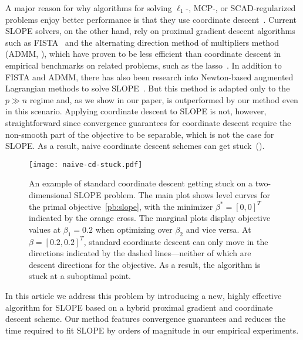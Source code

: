 A major reason for why algorithms for solving
$\ell_1$-, MCP-, or SCAD-regularized problems enjoy better performance is that
they use coordinate
descent~\parencite{tseng2001convergence,friedman2010,breheny2011}. Current SLOPE
solvers, on the other hand, rely on proximal gradient descent algorithms such
as FISTA~\parencite{beck2009} and the alternating direction method of multipliers
method (ADMM, \cite{boyd2010}), which have proven to be less efficient than
coordinate descent in empirical benchmarks on related problems, such as the
lasso~\parencite{moreau2022benchopt}.
In addition to FISTA and ADMM, there has also been research into Newton-based augmented Lagrangian methods to solve SLOPE~\parencite{Ziyan2019}.
But this method is adapted only to the \(p \gg n\) regime and, as we show in our paper, is outperformed by our method even in this scenario.
Applying coordinate descent to SLOPE is not,
however, straightforward since convergence guarantees for coordinate descent
require the non-smooth part of the objective to be separable, which is not the case for SLOPE. As a
result, naive coordinate descent schemes can get
stuck~().

\begin{figure}[htb]
  \centering
  \texttt{[image: naive-cd-stuck.pdf]}
  \caption{%
    An example of standard coordinate descent getting stuck on a two-dimensional SLOPE problem.
    The main plot shows level curves for the primal objective~\eqref{pb:slope}, with the minimizer \(\beta^* = [0, 0]^T\) indicated by the orange cross.
    The marginal plots display objective values at \(\beta_1 = 0.2\) when optimizing over \(\beta_2\) and vice versa.
    At \(\beta = [0.2,0.2]^T\), standard coordinate descent can only move in the directions indicated by the dashed lines---neither of which are descent directions for the objective.
    As a result, the algorithm is stuck at a suboptimal point.
  }
  \label{fig:naive-cd-stuck}
\end{figure}

In this article we address this problem by introducing a new, highly effective
algorithm for SLOPE based on a hybrid proximal gradient and coordinate descent
scheme. Our method features convergence guarantees and reduces the time
required to fit SLOPE by orders of magnitude in our empirical experiments.


